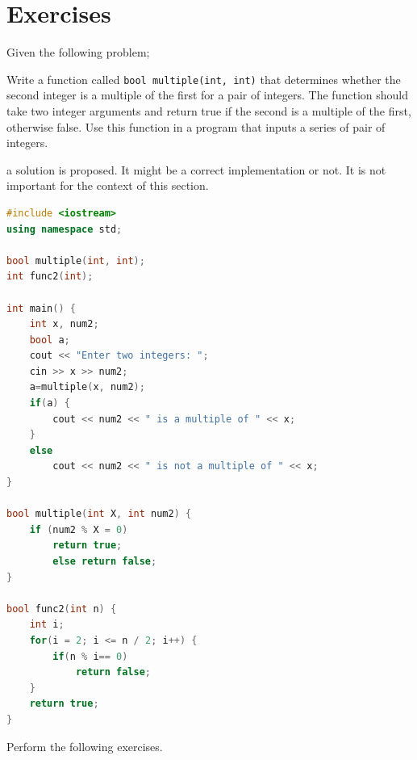 \section{Exercises}
Given the following problem;
\begin{displayquote}
    Write a function called \lstinline!bool multiple(int, int)! that determines whether the second integer is a multiple of the first for a pair of integers. The function should take two integer arguments and return true if the second is a multiple of the first, otherwise false. Use this function in a program that inputs a series of pair of integers.
\end{displayquote}
a solution is proposed. It might be a correct implementation or not. It is not important for the context of this section.
\begin{lstlisting}[language=C++]
#include <iostream>
using namespace std;

bool multiple(int, int);
int func2(int);

int main() {
    int x, num2;
    bool a;
    cout << "Enter two integers: ";
    cin >> x >> num2;
    a=multiple(x, num2);
    if(a) {
        cout << num2 << " is a multiple of " << x;
    }
    else
        cout << num2 << " is not a multiple of " << x;
}

bool multiple(int X, int num2) {
    if (num2 % X = 0)
        return true;
        else return false;
}

bool func2(int n) {
    int i;
    for(i = 2; i <= n / 2; i++) {
        if(n % i== 0)
            return false;
    }
    return true;
}
\end{lstlisting}
Perform the following exercises.

